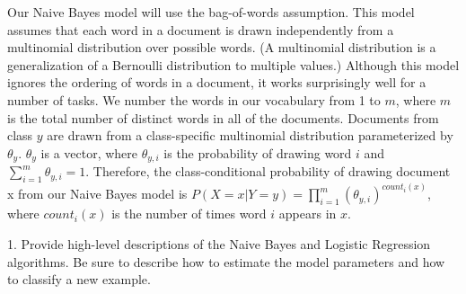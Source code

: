 \documentclass{article}
\theoremstyle{definition}
\theoremstyle{definition}
\theoremstyle{remark}
\begin{document}
Our Naive Bayes model will use the bag-of-words assumption. This model assumes that each word in a
document is drawn independently from a multinomial distribution over possible words. (A multinomial
distribution is a generalization of a Bernoulli distribution to multiple values.) Although this model ignores
the ordering of words in a document, it works surprisingly well for a number of tasks. We number the words
in our vocabulary from 1 to $m$, where $m$ is the total number of distinct words in all of the documents.
Documents from class $y$ are drawn from a class-specific multinomial distribution parameterized by $\theta_y$. $\theta_y$ is
a vector, where $\theta_{y,i}$ is the probability of drawing word $i$ and $\sum_{i=1}^m \theta_{y,i}=1$.
Therefore, the class-conditional probability of drawing document x from our Naive Bayes model is
$P(X = x|Y = y) = \prod_{i=1}^m (\theta_{y,i})^{count_i(x)}$, where $count_i(x)$ is the number of times word $i$ appears in $x$.

1. Provide high-level descriptions of the Naive Bayes and Logistic Regression algorithms. Be
sure to describe how to estimate the model parameters and how to classify a new example.
\end{document}
